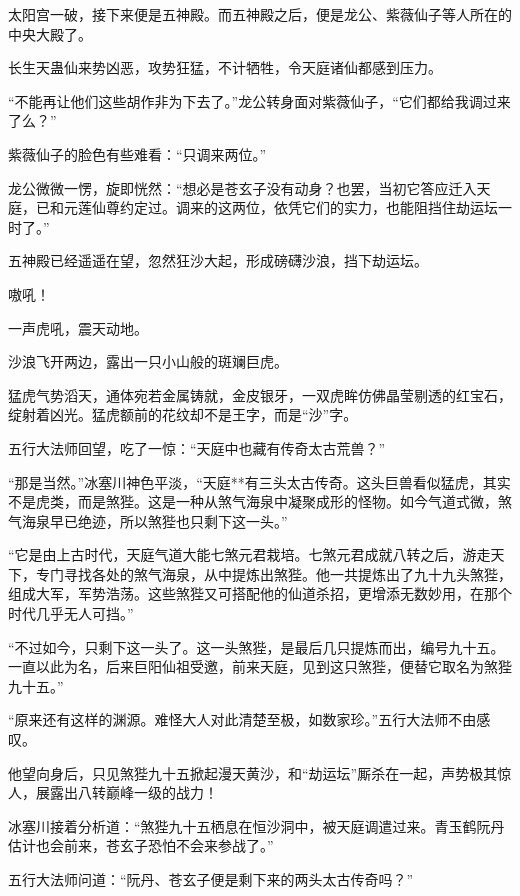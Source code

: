 
\begin{this_body}

太阳宫一破，接下来便是五神殿。而五神殿之后，便是龙公、紫薇仙子等人所在的中央大殿了。

长生天蛊仙来势凶恶，攻势狂猛，不计牺牲，令天庭诸仙都感到压力。

“不能再让他们这些胡作非为下去了。”龙公转身面对紫薇仙子，“它们都给我调过来了么？”

紫薇仙子的脸色有些难看：“只调来两位。”

龙公微微一愣，旋即恍然：“想必是苍玄子没有动身？也罢，当初它答应迁入天庭，已和元莲仙尊约定过。调来的这两位，依凭它们的实力，也能阻挡住劫运坛一时了。”

五神殿已经遥遥在望，忽然狂沙大起，形成磅礴沙浪，挡下劫运坛。

嗷吼！

一声虎吼，震天动地。

沙浪飞开两边，露出一只小山般的斑斓巨虎。

猛虎气势滔天，通体宛若金属铸就，金皮银牙，一双虎眸仿佛晶莹剔透的红宝石，绽射着凶光。猛虎额前的花纹却不是王字，而是“沙”字。

五行大法师回望，吃了一惊：“天庭中也藏有传奇太古荒兽？”

“那是当然。”冰塞川神色平淡，“天庭**有三头太古传奇。这头巨兽看似猛虎，其实不是虎类，而是煞狴。这是一种从煞气海泉中凝聚成形的怪物。如今气道式微，煞气海泉早已绝迹，所以煞狴也只剩下这一头。”

“它是由上古时代，天庭气道大能七煞元君栽培。七煞元君成就八转之后，游走天下，专门寻找各处的煞气海泉，从中提炼出煞狴。他一共提炼出了九十九头煞狴，组成大军，军势浩荡。这些煞狴又可搭配他的仙道杀招，更增添无数妙用，在那个时代几乎无人可挡。”

“不过如今，只剩下这一头了。这一头煞狴，是最后几只提炼而出，编号九十五。一直以此为名，后来巨阳仙祖受邀，前来天庭，见到这只煞狴，便替它取名为煞狴九十五。”

“原来还有这样的渊源。难怪大人对此清楚至极，如数家珍。”五行大法师不由感叹。

他望向身后，只见煞狴九十五掀起漫天黄沙，和“劫运坛”厮杀在一起，声势极其惊人，展露出八转巅峰一级的战力！

冰塞川接着分析道：“煞狴九十五栖息在恒沙洞中，被天庭调遣过来。青玉鹤阮丹估计也会前来，苍玄子恐怕不会来参战了。”

五行大法师问道：“阮丹、苍玄子便是剩下来的两头太古传奇吗？”


\end{this_body}

